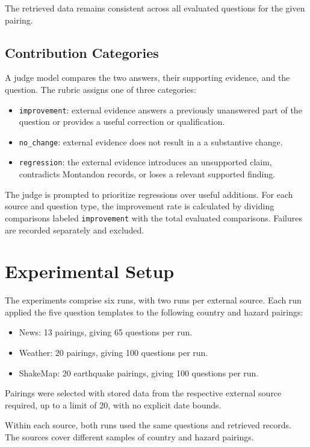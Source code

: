 \documentclass[journal]{IEEEtran}
\begin{document}
The retrieved data remains consistent across all evaluated questions for the given pairing.

\subsection{Contribution Categories}

A judge model compares the two answers, their supporting evidence, and the question.
The rubric assigns one of three categories:
\begin{itemize}
    \item \texttt{improvement}: external evidence answers a previously unanswered part of the question
    or provides a useful correction or qualification.
    \item \texttt{no\_change}: external evidence does not result in a a substantive change.
    \item \texttt{regression}: the external evidence introduces an unsupported claim,
    contradicts Montandon records, or loses a relevant supported finding.
\end{itemize}

The judge is prompted to prioritize regressions over useful additions.
For each source and question type, the improvement rate is calculated
by dividing comparisons labeled \texttt{improvement} with the total evaluated comparisons.
Failures are recorded separately and excluded.

\section{Experimental Setup}

The experiments comprise six runs, with two runs per external source.
Each run applied the five question templates to the following country and hazard pairings:
\begin{itemize}
    \item News: 13 pairings, giving 65 questions per run.
    \item Weather: 20 pairings, giving 100 questions per run.
    \item ShakeMap: 20 earthquake pairings, giving 100 questions per run.
\end{itemize}

Pairings were selected with stored data from the respective external
source required, up to a limit of 20, with no explicit date bounds.

Within each source, both runs used the same questions and retrieved records.
The sources cover different samples of country and hazard pairings.
\end{document}
